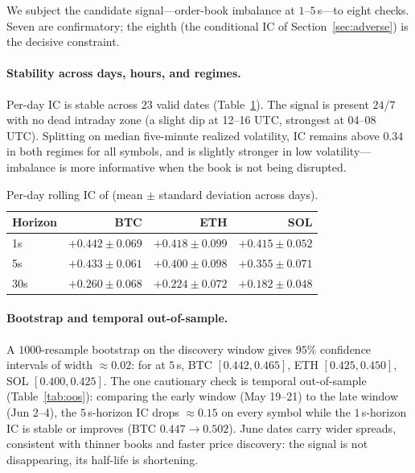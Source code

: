 \documentclass[11pt,a4paper]{article}
\theoremstyle{definition}
\theoremstyle{plain}
\newcommand{\code}[1]{\texttt{\detokenize{#1}}}
\begin{document}
We subject the candidate signal---order-book imbalance at $1$--$5$\,s---to eight checks. Seven are
confirmatory; the eighth (the conditional IC of Section~\ref{sec:adverse}) is the decisive
constraint.

\paragraph{Stability across days, hours, and regimes.}
Per-day IC is stable across $23$ valid dates (Table~\ref{tab:perday}). The signal is present
$24$/$7$ with no dead intraday zone (a slight dip at 12--16 UTC, strongest at 04--08 UTC).
Splitting on median five-minute realized volatility, IC remains above $0.34$ in both regimes for
all symbols, and is slightly stronger in low volatility---imbalance is more informative when the
book is not being disrupted.

\begin{table}[ht]
\begin{center}
\small
\begin{tabular}{lrrr}
\hline
\textbf{Horizon} & \textbf{BTC} & \textbf{ETH} & \textbf{SOL} \\
\hline
1s  & $+0.442 \pm 0.069$ & $+0.418 \pm 0.099$ & $+0.415 \pm 0.052$ \\
5s  & $+0.433 \pm 0.061$ & $+0.400 \pm 0.098$ & $+0.355 \pm 0.071$ \\
30s & $+0.260 \pm 0.068$ & $+0.224 \pm 0.072$ & $+0.182 \pm 0.048$ \\
\hline
\end{tabular}
\end{center}
\caption{Per-day rolling IC of \code{imbalance_qty_l1} (mean $\pm$ standard deviation across days).}
\label{tab:perday}
\end{table}

\paragraph{Bootstrap and temporal out-of-sample.}
A $1000$-resample bootstrap on the discovery window gives $95\%$ confidence intervals of width
$\approx 0.02$: for \code{imbalance_qty_l1} at $5$\,s, BTC $[0.442,0.465]$, ETH $[0.425,0.450]$,
SOL $[0.400,0.425]$. The one cautionary check is temporal out-of-sample
(Table~\ref{tab:oos}): comparing the early window (May 19--21) to the late window (Jun 2--4), the
$5$\,s-horizon IC drops $\approx 0.15$ on every symbol while the $1$\,s-horizon IC is stable or
improves (BTC $0.447\to 0.502$). June dates carry wider spreads, consistent with thinner books and
faster price discovery: the signal is not disappearing, its half-life is shortening.
\end{document}
